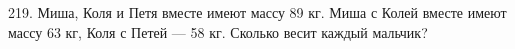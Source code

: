 219. Миша, Коля и Петя вместе имеют массу 89 кг. Миша с Колей вместе имеют массу 63 кг, Коля с Петей --- 58 кг. Сколько весит каждый мальчик?\\
